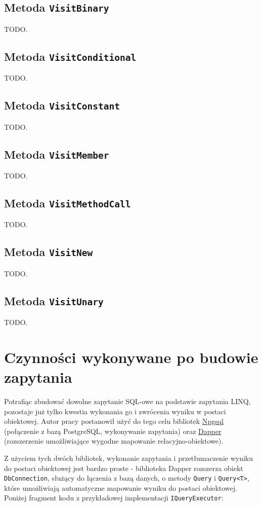 \subsection{Metoda \texttt{VisitBinary}}
TODO.

\subsection{Metoda \texttt{VisitConditional}}
TODO.

\subsection{Metoda \texttt{VisitConstant}}
TODO.

\subsection{Metoda \texttt{VisitMember}}
TODO.

\subsection{Metoda \texttt{VisitMethodCall}}
TODO.

\subsection{Metoda \texttt{VisitNew}}
TODO.

\subsection{Metoda \texttt{VisitUnary}}
TODO.

\section{Czynności wykonywane po budowie zapytania}
Potrafiąc zbudować dowolne zapytanie SQL-owe na podstawie zapytania LINQ, pozostaje już tylko kwestia wykonania go i zwrócenia wyniku w postaci obiektowej. Autor pracy postanowił użyć do tego celu bibliotek \href{}{Npgsql} (połączenie z bazą PostgreSQL, wykonywanie zapytania) oraz \href{}{Dapper} (rozszerzenie umożliwiające wygodne mapowanie relacyjno-obiektowe).

Z użyciem tych dwóch bibliotek, wykonanie zapytania i przetłumaczenie wyniku do postaci obiektowej jest bardzo proste - biblioteka Dapper rozszerza obiekt \texttt{DbConnection}, służący do łączenia z bazą danych, o metody \texttt{Query} i \texttt{Query<T>}, które umożliwiają automatyczne mapowanie wyniku do postaci obiektowej. Poniżej fragment kodu z przykładowej implementacji \texttt{IQueryExecutor}:

